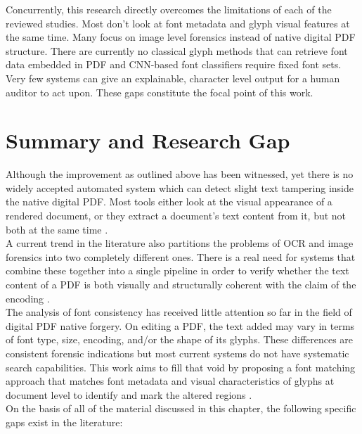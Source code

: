 \noindent Concurrently, this research directly overcomes the limitations of each of the reviewed studies. Most don't look at font metadata and glyph visual features at the same time. Many focus on image level forensics instead of native digital PDF structure. There are currently no classical glyph methods that can retrieve font data embedded in PDF and CNN-based font classifiers require fixed font sets. Very few systems can give an explainable, character level output for a human auditor to act upon. These gaps constitute the focal point of this work.\\

\section{Summary and Research Gap}

\noindent Although the improvement as outlined above has been witnessed, yet there is no widely accepted automated system which can detect slight text tampering inside the native digital PDF. Most tools either look at the visual appearance of a rendered document, or they extract a document's text content from it, but not both at the same time \cite{Qu2023TamperedText,Kumar2025RealTimeFraud}.\\

\noindent A current trend in the literature also partitions the problems of OCR and image forensics into two completely different ones. There is a real need for systems that combine these together into a single pipeline in order to verify whether the text content of a PDF is both visually and structurally coherent with the claim of the encoding \cite{Ahmed2025AIForgeries,Cohen2025Forgery}.\\

\noindent The analysis of font consistency has received little attention so far in the field of digital PDF native forgery. On editing a PDF, the text added may vary in terms of font type, size, encoding, and/or the shape of its glyphs. These differences are consistent forensic indications but most current systems do not have systematic search capabilities. This work aims to fill that void by proposing a font matching approach that matches font metadata and visual characteristics of glyphs at document level to identify and mark the altered regions \cite{Chen2022FontForgery, Zhang2023PDFLayout}.\\

On the basis of all of the material discussed in this chapter, the following specific gaps exist in the literature:

